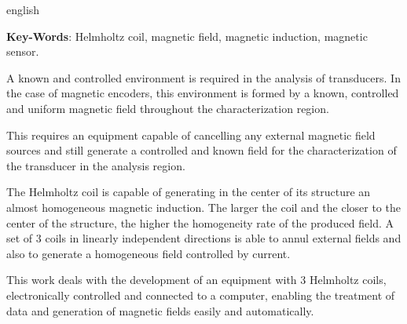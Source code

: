 \documentclass{ifscTCC} %
\begin{document}
\begin{resumo}[ABSTRACT]
\begin{otherlanguage*}{english}



\noindent
\textbf{Key-Words}: Helmholtz coil, magnetic field, magnetic induction, magnetic sensor. 


A known and controlled environment is required in the analysis of transducers. In the case of magnetic encoders, this environment is formed by a known, controlled and uniform magnetic field throughout the characterization region.

This requires an equipment capable of cancelling any external magnetic field sources and still generate a controlled and known field for the characterization of the transducer in the analysis region.

The Helmholtz coil is capable of generating in the center of its structure an almost homogeneous magnetic induction. The larger the coil and the closer to the center of the structure, the higher the homogeneity rate of the produced field. A set of 3 coils in linearly independent directions is able to annul external fields and also to generate a homogeneous field controlled by current.

This work deals with the development of an equipment with 3 Helmholtz coils, electronically controlled and connected to a computer, enabling the treatment of data and generation of magnetic fields easily and automatically.

\end{otherlanguage*}
\end{resumo}

\listoffigures*
\cleardoublepage

\listoftables*
\cleardoublepage
\end{document}
